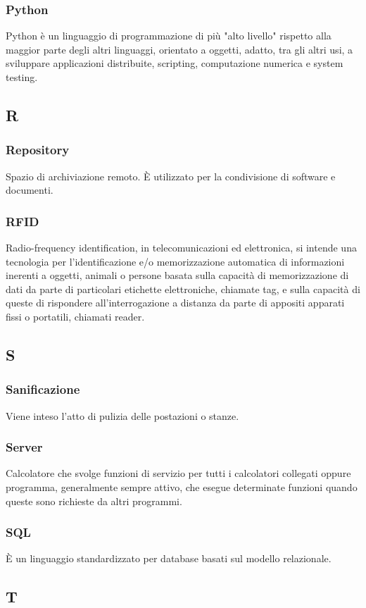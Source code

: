 \subsubsection*{Python} Python è un linguaggio di programmazione di più "alto livello" rispetto alla maggior parte degli altri linguaggi, orientato a oggetti, adatto, tra gli altri usi, a sviluppare applicazioni distribuite, scripting, computazione numerica e system testing.
\subsection*{R}
\subsubsection*{Repository} Spazio di archiviazione remoto. È utilizzato per la condivisione di software e documenti.
\subsubsection*{RFID} Radio-frequency identification, in telecomunicazioni ed elettronica, si intende una tecnologia per l'identificazione e/o memorizzazione automatica di informazioni inerenti a oggetti, animali o persone basata sulla capacità di memorizzazione di dati da parte di particolari etichette elettroniche, chiamate tag, e sulla capacità di queste di rispondere all'interrogazione a distanza da parte di appositi apparati fissi o portatili, chiamati reader.
\subsection*{S}
\subsubsection*{Sanificazione} Viene inteso l'atto di pulizia delle postazioni o stanze.
\subsubsection*{Server} Calcolatore che svolge funzioni di servizio per tutti i calcolatori collegati oppure programma, generalmente sempre attivo, che esegue determinate funzioni quando queste sono richieste da altri programmi.
\subsubsection*{SQL} È un linguaggio standardizzato per database basati sul modello relazionale.
\subsection*{T}
